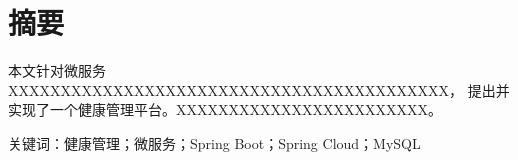 \section*{摘\quad 要}

本文针对微服务XXXXXXXXXXXXXXXXXXXXXXXXXXXXXXXXXXXXXXXXXX，
提出并实现了一个健康管理平台。XXXXXXXXXXXXXXXXXXXXXXXX。

关键词：健康管理；微服务；Spring Boot；Spring Cloud；MySQL
